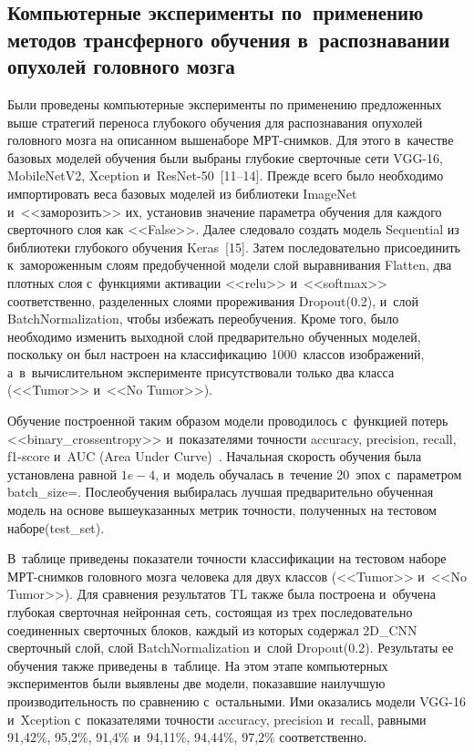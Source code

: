 \begin{multicols}{2}
{}

  
\section{Компьютерные эксперименты по~применению методов 
трансферного обучения в~распознавании опухолей головного мозга}

  Были проведены компьютерные эксперименты по применению 
предложенных выше стратегий переноса глубокого обучения для 
распознавания опухолей головного мозга на описанном выше\linebreak наборе  
МРТ-сним\-ков. Для этого в~качестве базовых моделей обучения были выбраны 
глубокие сверточные сети VGG-16, MobileNetV2, Xception 
и~\mbox{ResNet-50}~[11--14]. Прежде всего было необходимо импортировать веса базовых 
моделей из биб\-лио\-те\-ки ImageNet и~<<заморозить>> их, установив значение 
параметра обучения для каждого сверточного слоя как <<False>>. Далее 
следовало создать модель Sequential из библиотеки глубокого обучения 
Keras~[15]. Затем последовательно присоединить к~замороженным слоям 
предобученной модели слой выравнивания Flatten, два плотных слоя 
с~функциями активации <<relu>> и~<<softmax>> соответственно, разделенных 
слоями прореживания Dropout(0.2), и~слой BatchNormalization, чтобы 
избежать переобучения. Кроме того, было необходимо изменить выходной 
слой предварительно обучен\-ных моделей, поскольку он был настроен на 
классификацию 1000~классов изображений, а~в~вычислительном 
эксперименте присутствовали только два класса (<<Tumor>> и~<<No Tumor>>). 

Обучение построенной таким образом модели проводилось с~функцией потерь 
<<binary\_crossentropy>> и~показателями точности accuracy, precision, recall,  
f1-score и~AUC (Area Under Curve)~\cite{9-shet, 15-shet}. Начальная ско\-рость 
обучения была установлена равной $1e - 4$, и~модель обучалась в~течение 
20~эпох с~параметром batch\_size\;=. После\linebreak обучения выбиралась лучшая 
предварительно обучен\-ная модель на основе вышеуказанных мет\-рик  
точ\-ности, полученных на тестовом наборе\linebreak (test\_set). 

В~таблице приведены 
показатели точности классификации на тестовом наборе МРТ-сним\-ков 
головного мозга человека для двух классов (<<Tumor>> и~<<No Tumor>>). Для 
сравнения результатов TL также была построена и~обучена глубокая сверточная 
нейронная сеть, состоящая из трех последовательно соединенных сверточных 
блоков, каждый из которых содержал 2D\_CNN сверточный слой, слой 
BatchNormalization и~слой Dropout(0.2). Результаты ее обучения также 
приведены в~таблице. На этом этапе компьютерных экспериментов были 
выявлены две модели, показавшие наилучшую производительность по 
сравнению с~остальными. Ими оказались модели VGG-16 и~Xception 
с~показателями точности accuracy, precision и~recall, равными 91,42\%, 95,2\%, 
91,4\% и~94,11\%, 94,44\%, 97,2\% соответственно.
  

\end{multicols}

